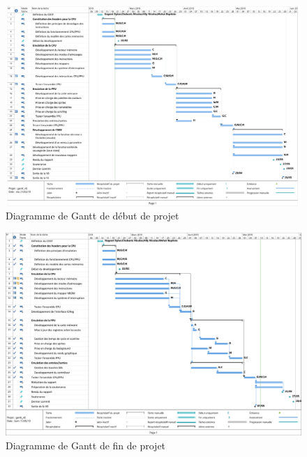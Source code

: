 \begin{figure}[H]
  \centering
   \includegraphics[width=0.90\linewidth]{images/GanttV1.png}
   \caption{Diagramme de Gantt de début de projet}
   \label{fig:gantt_debut}
\end{figure}

\begin{figure}[H]
  \centering
   \includegraphics[width=0.90\linewidth]{images/GanttV2.png}
   \caption{Diagramme de Gantt de fin de projet}
   \label{fig:gantt_fin}
\end{figure}
